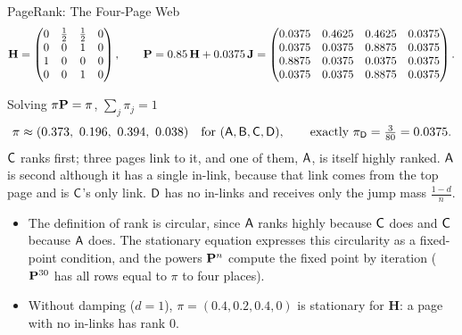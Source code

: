 \begin{frame}{PageRank: The Four-Page Web}
  \label{fr:pagerank2}
  \small
  \[
    \mathbf H=\begin{pmatrix}0&\tfrac12&\tfrac12&0\\0&0&1&0\\1&0&0&0\\0&0&1&0\end{pmatrix},\qquad
    \mathbf{P}=0.85\,\mathbf H+0.0375\,\mathbf J=\begin{pmatrix}0.0375&0.4625&0.4625&0.0375\\0.0375&0.0375&0.8875&0.0375\\0.8875&0.0375&0.0375&0.0375\\0.0375&0.0375&0.8875&0.0375\end{pmatrix}.
  \]
  \begin{exampleblock}{Solving $\pi\mathbf{P}=\pi$, $\sum_j\pi_j=1$}
    \[
      \pi\approx(0.373,\ 0.196,\ 0.394,\ 0.038)\quad\text{for }(\st A,\st B,\st C,\st D),\qquad\text{exactly }\pi_{\st D}=\tfrac{3}{80}=0.0375 .
    \]
    $\mathsf{C}$ ranks first; three pages link to it, and one of them, $\mathsf{A}$, is itself highly ranked. $\mathsf{A}$ is second although it has a single in-link, because that link comes from the top page and is $\mathsf{C}$'s only link. $\mathsf{D}$ has no in-links and receives only the jump mass $\frac{1-d}{n}$.
  \end{exampleblock}
  \begin{itemize}
    \item The definition of rank is circular, since $\mathsf{A}$ ranks highly because $\mathsf{C}$ does and $\mathsf{C}$ because $\mathsf{A}$ does. The stationary equation expresses this circularity as a fixed-point condition, and the powers $\mathbf{P}^n$ compute the fixed point by iteration ($\mathbf{P}^{30}$ has all rows equal to $\pi$ to four places).
    \item Without damping ($d=1$), $\pi=(0.4,0.2,0.4,0)$ is stationary for $\mathbf H$: a page with no in-links has rank $0$.
  \end{itemize}
\end{frame}


